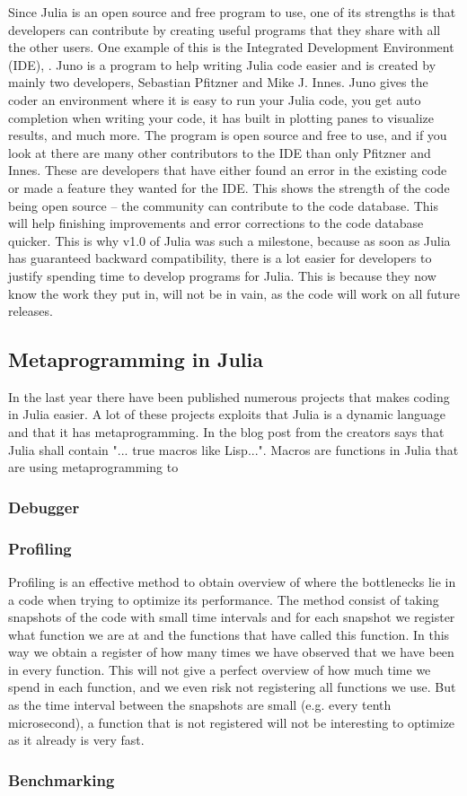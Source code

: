 Since Julia is an open source and free program to use, one of its strengths is that developers can contribute by creating useful programs that they share with all the other users. One example of this is the Integrated Development Environment (IDE), \cite{JunoIDE}. Juno is a program to help writing Julia code easier and is created by mainly two developers, Sebastian Pfitzner and Mike J. Innes. Juno gives the coder an environment where it is easy to run your Julia code, you get auto completion when writing your code, it has built in plotting panes to visualize results, and much more. The program is open source and free to use, and if you look at \cite{JunoGithub} there are many other contributors to the IDE than only Pfitzner and Innes. These are developers that have either found an error in the existing code or made a feature they wanted for the IDE. This shows the strength of the code being open source -- the community can contribute to the code database. This will help finishing improvements and error corrections to the code database quicker. This is why v1.0 of Julia was such a milestone, because as soon as Julia has guaranteed backward compatibility, there is a lot easier for developers to justify spending time to develop programs for Julia. This is because they now know the work they put in, will not be in vain, as the code will work on all future releases. 

\subsection{Metaprogramming in Julia}
\label{sec:Metaprogramming}
In the last year there have been published numerous projects that makes coding in Julia easier. A lot of these projects exploits that Julia is a dynamic language and that it has metaprogramming. In the blog post from \cite{juliaBlogRelease2012} the creators says that Julia shall contain "... true macros like Lisp...". Macros are functions in Julia that are using metaprogramming to 
\subsubsection{Debugger}
\subsubsection{Profiling}
Profiling is an effective method to obtain overview of where the bottlenecks lie in a code when trying to optimize its performance. The method consist of taking snapshots of the code with small time intervals and for each snapshot we register what function we are at and the functions that have called this function. In this way we obtain a register of how many times we have observed that we have been in every function. This will not give a perfect overview of how much time we spend in each function, and we even risk not registering all functions we use. But as the time interval between the snapshots are small (e.g. every tenth microsecond), a function that is not registered will not be interesting to optimize as it already is very fast. 
\subsubsection{Benchmarking}